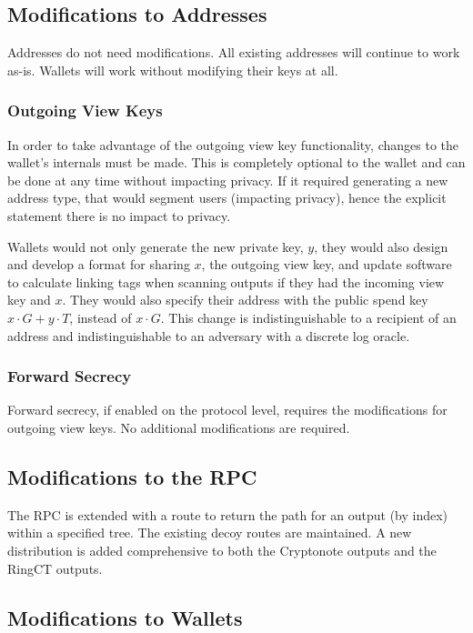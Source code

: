 \documentclass[]{article}
\begin{document}
\subsection{Modifications to Addresses}

Addresses do not need modifications. All existing addresses will continue to work as-is. Wallets will work without modifying their keys at all.

\subsubsection{Outgoing View Keys}

In order to take advantage of the outgoing view key functionality, changes to the wallet's internals must be made. This is completely optional to the wallet and can be done at any time without impacting privacy. If it required generating a new address type, that would segment users (impacting privacy), hence the explicit statement there is no impact to privacy.

Wallets would not only generate the new private key, $y$, they would also design and develop a format for sharing $x$, the outgoing view key, and update software to calculate linking tags when scanning outputs if they had the incoming view key and $x$. They would also specify their address with the public spend key $x \cdot G + y \cdot T$, instead of $x \cdot G$. This change is indistinguishable to a recipient of an address and indistinguishable to an adversary with a discrete log oracle.

\subsubsection{Forward Secrecy}

Forward secrecy, if enabled on the protocol level, requires the modifications for outgoing view keys. No additional modifications are required.

\subsection{Modifications to the RPC}

The RPC is extended with a route to return the path for an output (by index) within a specified tree. The existing decoy routes are maintained. A new distribution is added comprehensive to both the Cryptonote outputs and the RingCT outputs.

\subsection{Modifications to Wallets}
\end{document}
